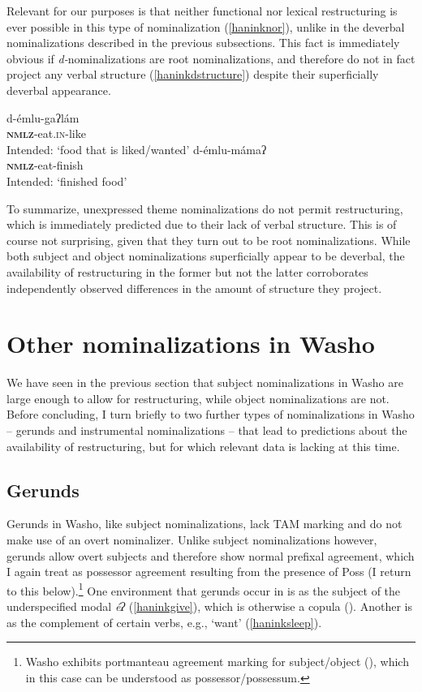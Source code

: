\documentclass[output=paper]{langscibook}
\begin{document}
 \vspace{-1em}
Relevant for our purposes is that neither functional nor lexical restructuring is ever possible in this type of nominalization (\ref{haninknor}), unlike in the deverbal nominalizations described in the previous subsections.  This fact is immediately obvious if  {\itshape d-}nominalizations are root nominalizations, and therefore do not in fact project any verbal structure (\ref{haninkdstructure}) despite their superficially deverbal appearance.

 \label{haninknor}
\ea \gll *d-émlu-gaʔlám\\
\textbf{\textsc{nmlz}}-eat.{\scshape in}-like\\
\glt Intended: `food that is liked/wanted'
\ex \gll *d-émlu-mámaʔ\\
\textbf{\textsc{nmlz}}-eat-finish\\
\glt Intended: `finished food' 
\z
\z
 
To summarize, unexpressed theme nominalizations do not permit restructuring, which is immediately predicted due to their lack of verbal structure. This is of course not surprising, given that they turn out to be root nominalizations. While both subject and object nominalizations superficially appear to be deverbal, the availability of restructuring in the former but not the latter corroborates independently observed differences in the amount of structure they project.

\section{Other nominalizations in Washo} \label{haninksec:4}

We have seen in the previous section that subject nominalizations in Washo are large enough to allow for restructuring, while object nominalizations are not. Before concluding, I turn briefly to two further types of nominalizations in Washo -- gerunds and instrumental nominalizations -- that lead to predictions about the availability of restructuring, but for which relevant data is lacking at this time.

\subsection{Gerunds}

Gerunds in Washo, like subject nominalizations,  lack TAM marking and do not make use of an overt nominalizer. Unlike subject nominalizations however, gerunds allow overt subjects and therefore show normal prefixal agreement, which I again treat as possessor agreement resulting from the presence of Poss (I return to this below).\footnote{Washo exhibits portmanteau agreement marking for subject/object (\citealt{jacobsen1964}), which in this case can be understood as possessor/possessum.} One  environment that gerunds occur in is as the subject of the underspecified modal {\itshape éʔ} (\ref{haninkgive}), which is otherwise a copula (\citealt{bochnak2015wscla,bochnak2015nels}). Another is as the  complement of certain  verbs, e.g., `want' (\ref{haninksleep}).
 
\end{document}
